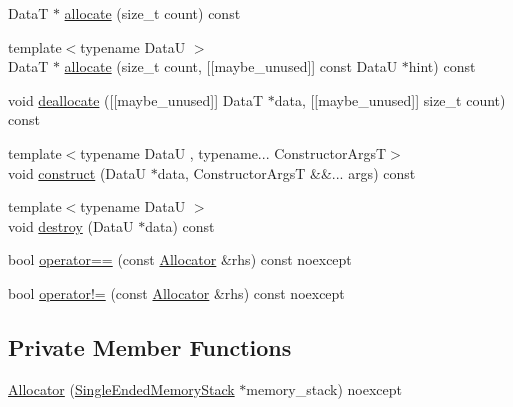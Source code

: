 \begin{DoxyCompactItemize}
\item 
DataT $\ast$ \hyperlink{structmage_1_1_single_ended_memory_stack_1_1_allocator_a076727a4db2bd233d80ccbc5f01b84e5}{allocate} (size\+\_\+t count) const
\item 
{\footnotesize template$<$typename DataU $>$ }\\DataT $\ast$ \hyperlink{structmage_1_1_single_ended_memory_stack_1_1_allocator_a36d8610c0bd9dec00f7531e469903272}{allocate} (size\+\_\+t count, \mbox{[}\mbox{[}maybe\+\_\+unused\mbox{]}\mbox{]} const DataU $\ast$hint) const
\item 
void \hyperlink{structmage_1_1_single_ended_memory_stack_1_1_allocator_ad284aba63d1dffeb0d6e5a1f005cfdf8}{deallocate} (\mbox{[}\mbox{[}maybe\+\_\+unused\mbox{]}\mbox{]} DataT $\ast$data, \mbox{[}\mbox{[}maybe\+\_\+unused\mbox{]}\mbox{]} size\+\_\+t count) const
\item 
{\footnotesize template$<$typename DataU , typename... Constructor\+ArgsT$>$ }\\void \hyperlink{structmage_1_1_single_ended_memory_stack_1_1_allocator_a87ef0a827c34c92f7df79daddc1a30ff}{construct} (DataU $\ast$data, Constructor\+ArgsT \&\&... args) const
\item 
{\footnotesize template$<$typename DataU $>$ }\\void \hyperlink{structmage_1_1_single_ended_memory_stack_1_1_allocator_ab2fe59e83fe573f39aa73389a08de2f9}{destroy} (DataU $\ast$data) const
\item 
bool \hyperlink{structmage_1_1_single_ended_memory_stack_1_1_allocator_a9ef3d489b794331df54dbba0de0aa6ce}{operator==} (const \hyperlink{structmage_1_1_single_ended_memory_stack_1_1_allocator}{Allocator} \&rhs) const noexcept
\item 
bool \hyperlink{structmage_1_1_single_ended_memory_stack_1_1_allocator_a671edfb0489c30d545b5b513a0fa3b6e}{operator!=} (const \hyperlink{structmage_1_1_single_ended_memory_stack_1_1_allocator}{Allocator} \&rhs) const noexcept
\end{DoxyCompactItemize}
\subsection*{Private Member Functions}
\begin{DoxyCompactItemize}
\item 
\hyperlink{structmage_1_1_single_ended_memory_stack_1_1_allocator_a991173b1fccf74994dc9298b3cffb795}{Allocator} (\hyperlink{classmage_1_1_single_ended_memory_stack}{Single\+Ended\+Memory\+Stack} $\ast$memory\+\_\+stack) noexcept
\end{DoxyCompactItemize}
